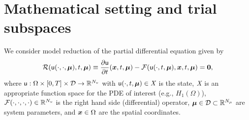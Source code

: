 \documentclass[3p,computermodern,10pt]{elsarticle}
\begin{document}
\section{Mathematical setting and trial subspaces}
We consider model reduction of the partial differential equation given by
\begin{equation}\label{eq:fom}
\mathcal{R}(\mathsf{u}(\cdot,\cdot,\boldsymbol \mu),t,\boldsymbol \mu) \equiv \frac{\partial \mathsf{u}}{\partial t}(\boldsymbol x, t,\boldsymbol \mu) - \mathcal{F}(\mathsf{u}(\cdot,t,\boldsymbol \mu),\boldsymbol x, t,\boldsymbol \mu) = \boldsymbol 0, 
\end{equation}
where $\mathsf{u}: \Omega \times [0,T] \times \mathcal{D} \rightarrow \mathbb{R}^{N_v}$ with $\mathsf{u}(\cdot,t,\boldsymbol \mu) \in \textit{X}$ is the state, $\textit{X}$ is an appropriate function space for the PDE of interest (e.g., $H_1(\Omega)$), $\mathcal{F}(\cdot,\cdot,\cdot,\cdot) \in \mathbb{R}^{N_v}$ is the right hand side (differential) operator, $\boldsymbol \mu \in \mathcal{D} \subset \mathbb{R}^{N_{\mu}}$  are system parameters, and $\boldsymbol x \in \Omega$ are the spatial coordinates.
\end{document}
